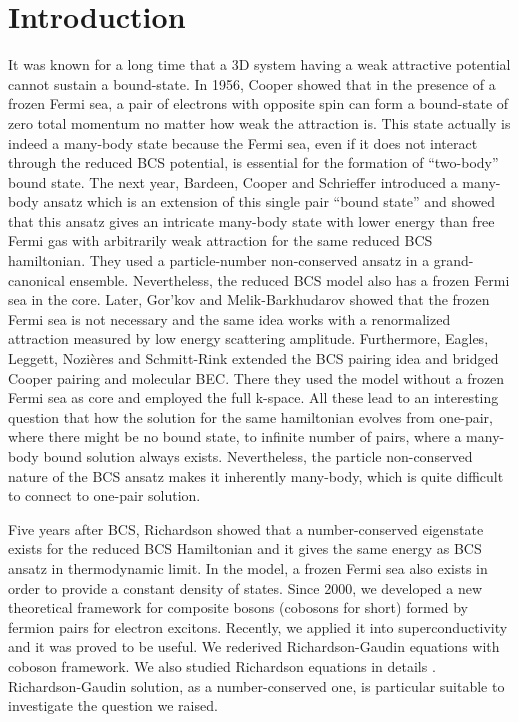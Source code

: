 \documentclass[5p,twocolumn]{elsarticle}
\begin{document}
\maketitle
\section{Introduction}
It was known for a long time that a 3D system having a weak attractive potential cannot sustain a bound-state.  In 1956, Cooper showed that in the presence of a frozen Fermi sea, a pair of electrons with opposite spin can form a bound-state of zero total momentum  no matter how weak the attraction is\cite{Cooper}.  This state actually is indeed a many-body state because the  Fermi sea, even if it does not interact through the reduced BCS potential,  is essential for the formation of ``two-body'' bound state.   The next year, Bardeen, Cooper and Schrieffer introduced a many-body ansatz which is an extension of this single pair ``bound state'' and showed that this ansatz gives an intricate many-body state with lower energy than free Fermi gas with arbitrarily weak attraction\cite{BCS} for the same reduced BCS hamiltonian.  They used a particle-number non-conserved ansatz in a grand-canonical ensemble.  Nevertheless, the reduced BCS model also has a frozen Fermi sea in the core.
  Later,   Gor'kov and Melik-Barkhudarov showed that the frozen Fermi sea is not necessary and the same idea works with a renormalized attraction measured by low energy scattering amplitude\cite{Gorkov}.   Furthermore, Eagles\cite{Eagle}, Leggett\cite{LeggettCrossover}, Nozi\`{e}res and Schmitt-Rink\cite{Nozieres} extended the BCS pairing idea and bridged Cooper pairing and molecular BEC. There they used the model without a frozen Fermi sea as core and employed the full k-space.  All these lead to an interesting question that how the solution for the same hamiltonian evolves from one-pair, where there might be no bound state, to infinite number of pairs, where a many-body bound solution always exists.  Nevertheless, the particle non-conserved nature of the BCS ansatz makes it inherently many-body, which is quite difficult to connect to one-pair solution.  

Five years after BCS, Richardson showed that a number-conserved eigenstate exists for the reduced BCS Hamiltonian and it gives the same energy as BCS ansatz in thermodynamic limit\cite{Richardson1,Richardson2,Richardson3,Richardson1968,gaudin}.  In the model, a frozen Fermi sea also exists in order to provide a constant density of states.  Since 2000, we developed a new theoretical framework for composite bosons (cobosons for short) formed by fermion pairs for electron excitons\cite{CobosonPhysicsReports}.   Recently, we applied it into superconductivity and it was proved to be useful.  We rederived Richardson-Gaudin equations with coboson framework\cite{CobosonBcsRich}. We also studied Richardson equations in details \cite{CombescotCooper,combescotBCS}.  Richardson-Gaudin solution, as a number-conserved one, is  particular suitable to investigate the question we raised.  
\end{document}
